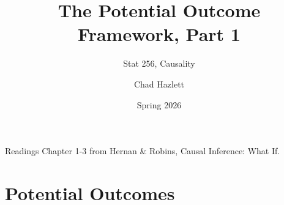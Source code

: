 \documentclass[xcolor=dvipsnames]{beamer}
\title[]{The Potential Outcome Framework, Part 1}
\subtitle[ ]{Stat 256, Causality}
\date{Spring 2026}
\author[Hazlett]{Chad Hazlett }
\institute[UCLA]{UCLA\\[1ex]
  \texttt{chazlett@ucla.edu}
}
\begin{document}
\subject{Talks}


\begin{frame}
  \titlepage
\end{frame}

%


\begin{frame}{Readings}
Chapter 1-3 from Hernan \& Robins,  Causal Inference: What If. 
\end{frame}

\section{Potential Outcomes}
\end{document}
